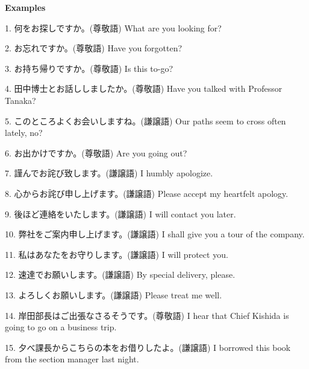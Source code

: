 \begin{center}
\textbf{Examples }
\end{center}

\par{1. 何をお探しですか。(尊敬語) \hfill\break
What are you looking for? }

\par{2. お忘れですか。(尊敬語) \hfill\break
Have you forgotten? }

\par{3. お持ち帰りですか。(尊敬語) \hfill\break
Is this to-go? }

\par{4. 田中博士とお話ししましたか。(尊敬語) \hfill\break
Have you talked with Professor Tanaka? }

\par{5. このところよくお会いしますね。(謙譲語) \hfill\break
Our paths seem to cross often lately, no? }

\par{6. お出かけですか。(尊敬語) \hfill\break
Are you going out? }

\par{7. 謹んでお詫び致します。(謙譲語) \hfill\break
I humbly apologize. }

\par{8. 心からお詫び申し上げます。(謙譲語) \hfill\break
Please accept my heartfelt apology. }

\par{9. 後ほど連絡をいたします。(謙譲語) \hfill\break
I will contact you later. }

\par{10. 弊社をご案内申し上げます。(謙譲語) \hfill\break
I shall give you a tour of the company. }

\par{11. 私はあなたをお守りします。(謙譲語) \hfill\break
I will protect you. }

\par{12. 速達でお願いします。(謙譲語) \hfill\break
By special delivery, please. }

\par{13. よろしくお願いします。(謙譲語) \hfill\break
Please treat me well. }

\par{14. 岸田部長はご出張なさるそうです。(尊敬語) \hfill\break
I hear that Chief Kishida is going to go on a business trip. }

\par{15. 夕べ課長からこちらの本をお借りしたよ。(謙譲語) \hfill\break
I borrowed this book from the section manager last night. }

